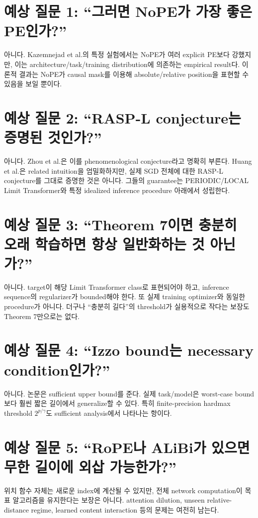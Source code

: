\documentclass[11pt,a4paper,oneside,openany]{memoir}
\theoremstyle{definition}
\begin{document}
\section{예상 질문 1: ``그러면 NoPE가 가장 좋은 PE인가?''}

아니다. Kazemnejad et al.의 특정 실험에서는 NoPE가 여러 explicit PE보다 강했지만,
이는 architecture/task/training distribution에 의존하는 empirical result다.
이론적 결과는 NoPE가 causal mask를 이용해 absolute/relative position을 표현할 수 있음을 보일 뿐이다.

\section{예상 질문 2: ``RASP-L conjecture는 증명된 것인가?''}

아니다. Zhou et al.은 이를 phenomenological conjecture라고 명확히 부른다.
Huang et al.은 related intuition을 엄밀화하지만, 실제 SGD 전체에 대한 RASP-L conjecture를 그대로 증명한 것은 아니다.
그들의 guarantee는 PERIODIC/LOCAL Limit Transformer와 특정 idealized inference procedure 아래에서 성립한다.

\section{예상 질문 3: ``Theorem 7이면 충분히 오래 학습하면 항상 일반화하는 것 아닌가?''}

아니다. target이 해당 Limit Transformer class로 표현되어야 하고, inference sequence의 regularizer가 bounded해야 한다.
또 실제 training optimizer와 동일한 procedure가 아니다.
더구나 ``충분히 길다''의 threshold가 실용적으로 작다는 보장도 Theorem 7만으로는 없다.

\section{예상 질문 4: ``Izzo bound는 necessary condition인가?''}

아니다. 논문은 sufficient upper bound를 준다.
실제 task/model은 worst-case bound보다 훨씬 짧은 길이에서 generalize할 수 있다.
특히 finite-precision hardmax threshold $2^{p/\gamma}$도 sufficient analysis에서 나타나는 항이다.

\section{예상 질문 5: ``RoPE나 ALiBi가 있으면 무한 길이에 외삽 가능한가?''}

위치 함수 자체는 새로운 index에 계산될 수 있지만, 전체 network computation이 목표 알고리즘을 유지한다는 보장은 아니다.
attention dilution, unseen relative-distance regime, learned content interaction 등의 문제는 여전히 남는다.
\end{document}
